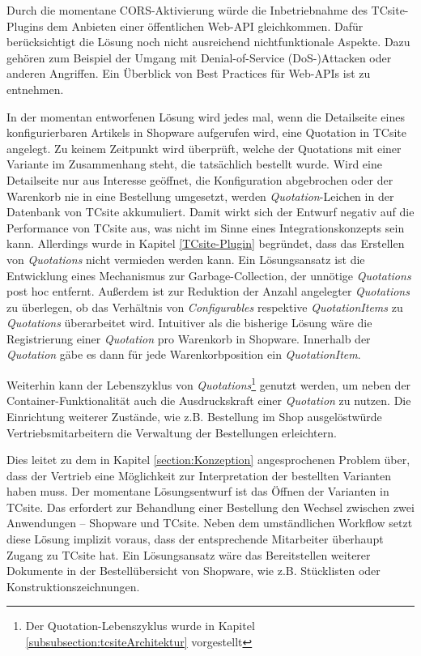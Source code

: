 \documentclass[11pt, a4paper, titlepage, listof=totoc, bibliography=totoc, index=totoc, twoside, openright, headings=normal, draft]{scrreprt}
\begin{document}
Durch die momentane CORS-Aktivierung würde die Inbetriebnahme des TCsite-Plugins dem Anbieten einer öffentlichen Web-API gleichkommen. Dafür berücksichtigt die Lösung noch nicht ausreichend nichtfunktionale Aspekte. Dazu gehören zum Beispiel der Umgang mit Denial-of-Service (DoS-)Attacken oder anderen Angriffen. Ein Überblick von Best Practices für Web-APIs ist \citet{tilkov11} zu entnehmen.

In der momentan entworfenen Lösung wird jedes mal, wenn die Detailseite eines konfigurierbaren Artikels in Shopware aufgerufen wird, eine Quotation in TCsite angelegt. Zu keinem Zeitpunkt wird überprüft, welche der Quotations mit einer Variante im Zusammenhang steht, die tatsächlich bestellt wurde. Wird eine Detailseite nur aus Interesse geöffnet, die Konfiguration abgebrochen oder der Warenkorb nie in eine Bestellung umgesetzt, werden \glqq \emph{Quotation}-Leichen\grqq{} in der Datenbank von TCsite akkumuliert. Damit wirkt sich der Entwurf negativ auf die Performance von TCsite aus, was nicht im Sinne eines Integrationskonzepts sein kann. Allerdings wurde in Kapitel \ref{TCsite-Plugin} begründet, dass das Erstellen von \emph{Quotations} nicht vermieden werden kann. Ein Lösungsansatz ist die Entwicklung eines Mechanismus zur Garbage-Collection, der unnötige \emph{Quotations} post hoc entfernt. Außerdem ist zur Reduktion der Anzahl angelegter \emph{Quotations} zu überlegen, ob das Verhältnis von \emph{Configurables} respektive \emph{QuotationItems} zu \emph{Quotations} überarbeitet wird. Intuitiver als die bisherige Lösung wäre die Registrierung einer \emph{Quotation} pro Warenkorb in Shopware. Innerhalb der \emph{Quotation} gäbe es dann für jede Warenkorbposition ein \emph{QuotationItem}.

Weiterhin kann der Lebenszyklus von \emph{Quotations}\footnote{Der Quotation-Lebenszyklus wurde in Kapitel \ref{subsubsection:tcsiteArchitektur} vorgestellt} genutzt werden, um neben der Container-Funktionalität auch die Ausdruckskraft einer \emph{Quotation} zu nutzen. Die Einrichtung weiterer Zustände, wie z.B. \glqq Bestellung im Shop ausgelöst\grqq würde Vertriebsmitarbeitern die Verwaltung der Bestellungen erleichtern.

Dies leitet zu dem in Kapitel \ref{section:Konzeption} angesprochenen Problem über, dass der Vertrieb eine Möglichkeit zur Interpretation der bestellten Varianten haben muss. Der momentane Lösungsentwurf ist das Öffnen der Varianten in TCsite. Das erfordert zur Behandlung einer Bestellung den Wechsel zwischen zwei Anwendungen -- Shopware und TCsite. Neben dem umständlichen Workflow setzt diese Lösung implizit voraus, dass der entsprechende Mitarbeiter überhaupt Zugang zu TCsite hat. Ein Lösungsansatz wäre das Bereitstellen weiterer Dokumente in der Bestellübersicht von Shopware, wie z.B. Stücklisten oder Konstruktionszeichnungen.
\end{document}

